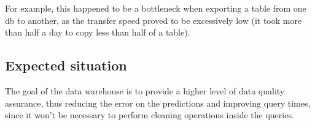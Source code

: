         For example, this happened to be a bottleneck when exporting a table from one db to another, as the transfer speed proved to be excessively low (it took more than half a day to copy less than half of a table).\reword

\subsection{Expected situation}
    \reword The goal of the data warehouse is to provide a higher level of data quality assurance, thus reducing the error on the predictions and improving query times, since it won't be necessary to perform cleaning operations inside the queries.
